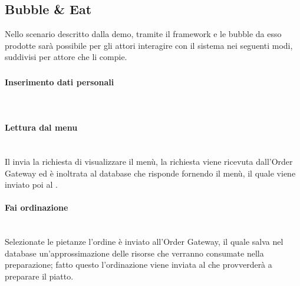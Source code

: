 \subsection{Bubble \& Eat}
Nello scenario descritto dalla demo, tramite il framework e le bubble da esso prodotte sarà possibile per gli attori interagire con il sistema nei seguenti modi, suddivisi per attore che li compie.

\subsubsection{\Customer{}}

\paragraph{Inserimento dati personali}\mbox{}\\

\paragraph{Lettura dal menu}\mbox{}\\
Il \Customer{} invia la richiesta di visualizzare il menù, la richiesta viene ricevuta dall’Order Gateway ed è inoltrata al database che risponde fornendo il menù, il quale viene inviato poi al \Customer{}.

\paragraph{Fai ordinazione}\mbox{}\\
Selezionate le pietanze l'ordine è inviato all’Order Gateway, il quale salva nel database un'approssimazione delle risorse che verranno consumate nella preparazione; fatto questo l'ordinazione viene inviata al \Chef{} che provverderà a preparare il piatto.

